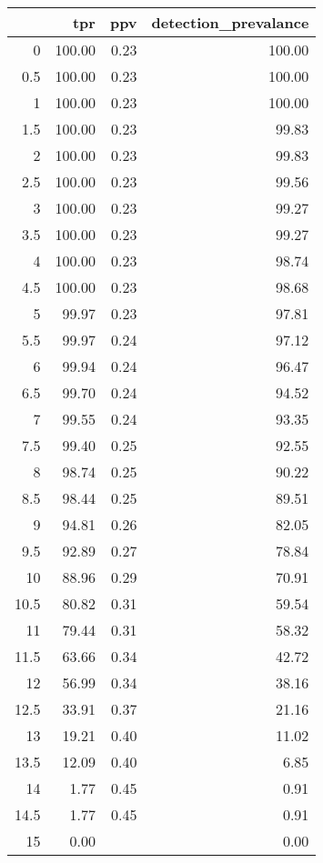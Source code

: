 \begin{table}[ht]
\centering
\begin{tabular}{rrrr}
  \hline
 & tpr & ppv & detection\_prevalance \\ 
  \hline
0 & 100.00 & 0.23 & 100.00 \\ 
  0.5 & 100.00 & 0.23 & 100.00 \\ 
  1 & 100.00 & 0.23 & 100.00 \\ 
  1.5 & 100.00 & 0.23 & 99.83 \\ 
  2 & 100.00 & 0.23 & 99.83 \\ 
  2.5 & 100.00 & 0.23 & 99.56 \\ 
  3 & 100.00 & 0.23 & 99.27 \\ 
  3.5 & 100.00 & 0.23 & 99.27 \\ 
  4 & 100.00 & 0.23 & 98.74 \\ 
  4.5 & 100.00 & 0.23 & 98.68 \\ 
  5 & 99.97 & 0.23 & 97.81 \\ 
  5.5 & 99.97 & 0.24 & 97.12 \\ 
  6 & 99.94 & 0.24 & 96.47 \\ 
  6.5 & 99.70 & 0.24 & 94.52 \\ 
  7 & 99.55 & 0.24 & 93.35 \\ 
  7.5 & 99.40 & 0.25 & 92.55 \\ 
  8 & 98.74 & 0.25 & 90.22 \\ 
  8.5 & 98.44 & 0.25 & 89.51 \\ 
  9 & 94.81 & 0.26 & 82.05 \\ 
  9.5 & 92.89 & 0.27 & 78.84 \\ 
  10 & 88.96 & 0.29 & 70.91 \\ 
  10.5 & 80.82 & 0.31 & 59.54 \\ 
  11 & 79.44 & 0.31 & 58.32 \\ 
  11.5 & 63.66 & 0.34 & 42.72 \\ 
  12 & 56.99 & 0.34 & 38.16 \\ 
  12.5 & 33.91 & 0.37 & 21.16 \\ 
  13 & 19.21 & 0.40 & 11.02 \\ 
  13.5 & 12.09 & 0.40 & 6.85 \\ 
  14 & 1.77 & 0.45 & 0.91 \\ 
  14.5 & 1.77 & 0.45 & 0.91 \\ 
  15 & 0.00 &  & 0.00 \\ 
   \hline
\end{tabular}
\end{table}

